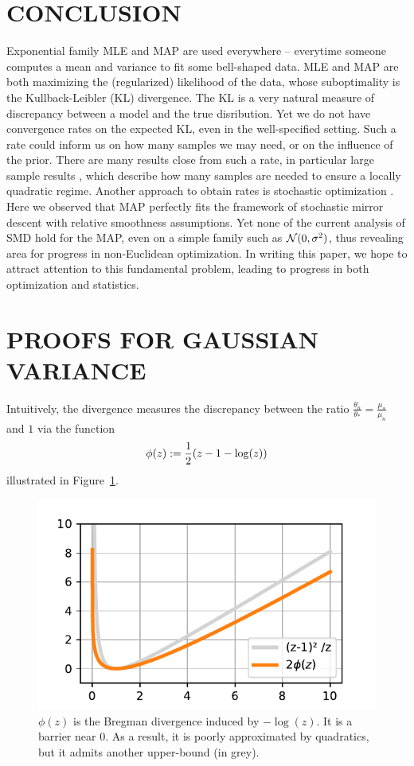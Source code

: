 \documentclass[twoside]{article}
\let\oldsection\section
\renewcommand{\section}[1]{\oldsection{\texorpdfstring{\uppercase{#1}}{#1}}}
\newcommand{\nat}{\theta}
\newcommand{\m}{\mu}
\begin{document}
\section{Conclusion}
Exponential family MLE and MAP are used everywhere -- everytime someone computes a mean and variance to fit some bell-shaped data.
MLE and MAP are both maximizing the (regularized) likelihood of the data, whose suboptimality is the Kullback-Leibler (KL) divergence.
The KL is a very natural measure of discrepancy between a model and the true disribution.
Yet we do not have convergence rates on the expected KL, even in the well-specified setting.
Such a rate could inform us on how many samples we may need, or on the influence of the prior.
There are many results close from such a rate, in particular large sample results \citep{kakade2010learning, ostrovskii2021finite}, which describe how many samples are needed to ensure a locally quadratic regime.
Another approach to obtain rates is stochastic optimization \citep{bach2013nonstronglyconvex}.
Here we observed that MAP perfectly fits the framework of stochastic mirror descent with relative smoothness assumptions.
Yet none of the current analysis of SMD hold for the MAP, even on a simple family such as ${\mathcal N}(0,\sigma^2)$, thus revealing area for progress in non-Euclidean optimization.
In writing this paper, we hope to attract attention to this fundamental problem, leading to progress in both optimization and statistics.



\newpage

 


\clearpage
\appendix
\onecolumn

\section{PROOFS FOR GAUSSIAN VARIANCE}
\label{app:gaussian-variance}

Intuitively, the divergence measures the discrepancy between the ratio $\frac{ \nat_n}{\nat_*} =  \frac{\m_*}{ \m_n}  $ and $1$ via the function
\begin{align}
	\phi(z) := \frac{1}{2} (z - 1 - \log(z))
\end{align}
illustrated in Figure~\ref{fig:phi}.
\begin{figure}[ht]
	\centering
	\includegraphics[width=.4\textwidth]{phi.pdf}
	\caption{$\phi(z)$ is the Bregman divergence induced by $-\log(z)$. It is a barrier near $0$. As a result, it is poorly approximated by quadratics, but it admits another upper-bound (in grey).}
	\label{fig:phi}
\end{figure}
\end{document}
